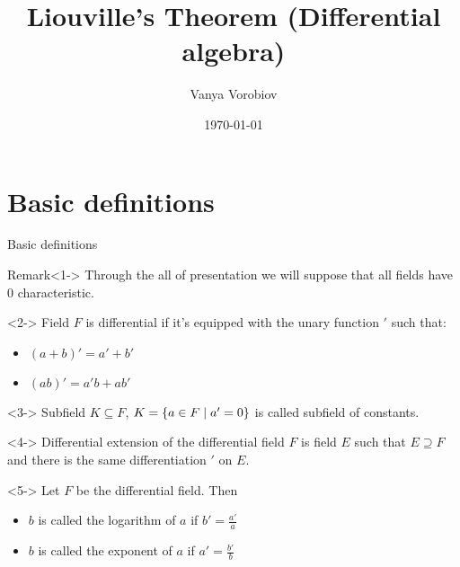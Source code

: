 \documentclass[8pt]{beamer}
\renewcommand{\|}{\ensuremath{\hspace{0.1cm} | \hspace{0.1cm}}}
\begin{document}
    \title[Liouville's Theorem]{Liouville's Theorem (Differential algebra)}
    \author{Vanya Vorobiov}
    \date{\today}

    \begin{frame}
        \titlepage
    \end{frame}

    \section{Basic definitions}
    \begin{frame}{Basic definitions}
        \begin{block}{Remark}<1->
            Through the all of presentation we will suppose that all fields have 0 characteristic.
        \end{block}
        \begin{definition}<2->
            Field $F$ is differential if it's equipped with the unary function $'$ such that:
            \begin{itemize}
                \item $(a+b)' = a' + b'$
                \item $(ab)' = a'b + ab'$
            \end{itemize}
        \end{definition}
        \begin{definition}<3->
            Subfield $K \subseteq F$, $K = \{ a \in F \| a' = 0 \}$ is called subfield of constants.
        \end{definition}
        \begin{definition}<4->
            Differential extension of the differential field $F$ is field $E$ such that $E \supseteq F$ and there is the same differentiation $'$ on $E$.
        \end{definition}
        \begin{definition}<5->
            Let $F$ be the differential field. Then
            \begin{itemize}
                \item $b$ is called the logarithm of $a$ if $b' = \frac{a'}{a}$
                \item $b$ is called the exponent of $a$ if $a' = \frac{b'}{b}$
            \end{itemize}
        \end{definition}
    \end{frame}
    
    
\end{document}
